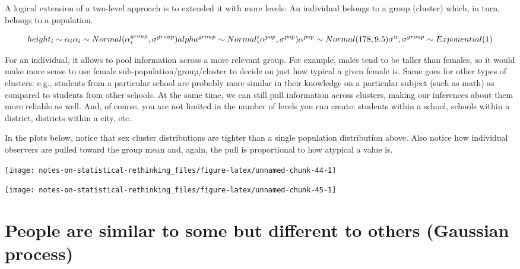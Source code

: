 \documentclass[
]{book}
\begin{document}
A logical extension of a two-level approach is to extended it with more levels: An individual belongs to a group (cluster) which, in turn, belongs to a population.

\[height_i \sim \alpha_i\\
\alpha_i \sim Normal(\alpha^{group}_i, \sigma^{group})\\
alpha^{group} \sim Normal(\alpha^{pop}, \sigma^{pop}) \\
\alpha^{pop} \sim Normal(178, 9.5)\\
\sigma^{\alpha}, \sigma^{group} \sim Exponential(1)\]

For an individual, it allows to pool information across a more relevant group. For example, males tend to be taller than females, so it would make more sense to use female sub-population/group/cluster to decide on just how typical a given female is. Same goes for other types of clusters: e.g., students from a particular school are probably more similar in their knowledge on a particular subject (such as math) as compared to students from other schools. At the same time, we can still pull information across clusters, making our inferences about them more reliable as well. And, of course, you are not limited in the number of levels you can create: students within a school, schools within a district, districts within a city, etc.

In the plots below, notice that sex cluster distributions are tighter than a single population distribution above. Also notice how individual observers are pulled toward the group mean and, again, the pull is proportional to how atypical a value is.

\begin{center}\texttt{[image: notes-on-statistical-rethinking\_files/figure-latex/unnamed-chunk-44-1]} \end{center}

\begin{center}\texttt{[image: notes-on-statistical-rethinking\_files/figure-latex/unnamed-chunk-45-1]} \end{center}

\hypertarget{people-are-similar-to-some-but-different-to-others-gaussian-process}{%
\section{People are similar to some but different to others (Gaussian process)}\label{people-are-similar-to-some-but-different-to-others-gaussian-process}}
\end{document}
